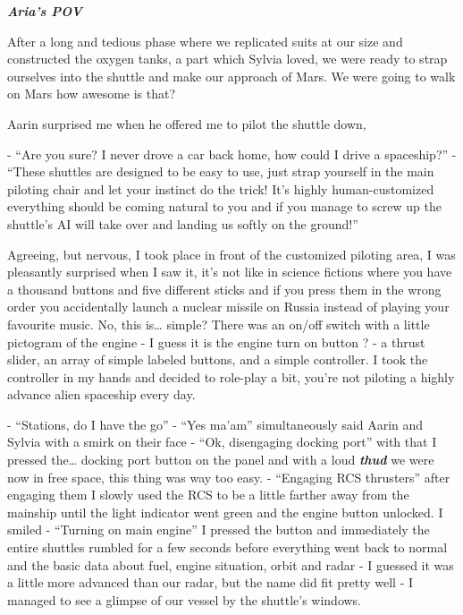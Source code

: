 \documentclass[hidelinks,12pt,a4paper]{book}
\begin{document}
\textit{\textbf{Aria's POV}}\par
\bigskip

After a long and tedious phase where we replicated suits at our size and constructed the oxygen tanks, 
a part which Sylvia loved, we were ready to strap ourselves into the shuttle and make our approach of Mars. 
We were going to walk on Mars how awesome is that? \par
\bigskip


Aarin surprised me when he offered me to pilot the shuttle down,\par
\bigskip

- “Are you sure? I never drove a car back home, how could I drive a spaceship?”\newline
- “These shuttles are designed to be easy to use, just strap yourself in the main piloting chair and let your 
instinct do the trick! It's highly human-customized everything should be coming natural to you and if you manage 
to screw up the shuttle's AI will take over and landing us softly on the ground!”\par
\bigskip

Agreeing, but nervous, I took place in front of the customized piloting area, I was pleasantly 
surprised when I saw it, it's not like in science fictions where you have a thousand buttons and five 
different sticks and if you press them in the wrong order you accidentally launch a nuclear missile on Russia 
instead of playing your favourite music. No, this is… simple? There was an on/off switch with a little pictogram 
of the engine - I guess it is the engine turn on button ? - a thrust slider, an array of simple labeled buttons,
 and a simple controller. I took the controller in my hands and decided to role-play a bit, you're not piloting 
 a highly advance alien spaceship every day.\par
 \bigskip

- “Stations, do I have the go”\newline
- “Yes ma'am” simultaneously said Aarin and Sylvia with a smirk on their face\newline
- “Ok, disengaging docking port” with that I pressed the… docking port button on the panel and 
 with a loud \textit{\textbf{thud}} we were now in free space, this thing was way too easy.\newline
- “Engaging RCS thrusters” after engaging them I slowly used the RCS to be a little farther away 
 from the mainship until the light indicator went green and the engine button unlocked. I smiled\newline
- “Turning on main engine” I pressed the button and immediately the entire shuttles rumbled 
 for a few seconds before everything went back to normal and the basic data about fuel, 
 engine situation, orbit and radar - I guessed it was a little more advanced than our 
 radar, but the name did fit pretty well - I managed to see a glimpse of our vessel by the shuttle's windows.\par
 \bigskip
\end{document}
